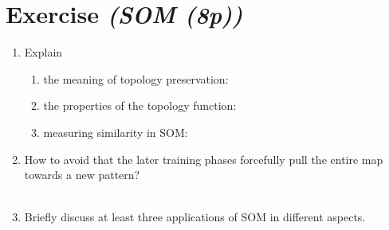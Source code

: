 \documentclass{article}
\begin{document}
\section{Exercise \textit{(SOM (8p))}}
\begin{enumerate}
    \item Explain\\
        \begin{enumerate}
            \item the meaning of topology preservation:
            \item the properties of the topology function:
            \item measuring similarity in SOM:
        \end{enumerate}
    \item How to avoid that the later training phases forcefully pull the entire
        map towards a new pattern?\\
        \\
    \item  Briefly discuss at least three applications of SOM in different aspects.\\
        \\
\end{enumerate}
\end{document}

